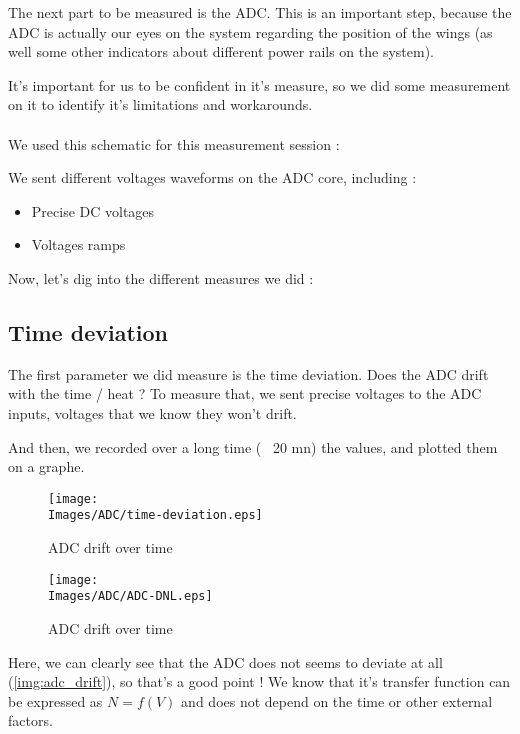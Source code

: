 The next part to be measured is the ADC. This is an important step, because the ADC is actually
our eyes on the system regarding the position of the wings (as well some other indicators about
different power rails on the system).

It's important for us to be confident in it's measure, so we did some measurement on it to identify
it's limitations and workarounds.

\paragraph{}
We used this schematic for this measurement session :


We sent different voltages waveforms on the ADC core, including :

\begin{itemize}[noitemsep]
    \item Precise DC voltages
    \item Voltages ramps
\end{itemize}

Now, let's dig into the different measures we did :

\FloatBarrier
\subsection{Time deviation}
The first parameter we did measure is the time deviation. Does the ADC drift with the time / heat ?
To measure that, we sent precise voltages to the ADC inputs, voltages that we know they won't drift.

And then, we recorded over a long time (~ 20 mn) the values, and plotted them on a graphe.

\begin{figure}[!hbt]
    \centering
    \begin{minipage}[c]{0.48\textwidth}
        \centering
        \texttt{[image: \\Images/ADC/time-deviation.eps]}
        \caption{ADC drift over time}\label{img:adc_drift}
    \end{minipage}%
    \hfill%
    \begin{minipage}[c]{0.48\textwidth}
        \centering
        \texttt{[image: \\Images/ADC/ADC-DNL.eps]}
        \caption{ADC drift over time}\label{img:adc_dnl}
    \end{minipage}%
\end{figure}
\FloatBarrier

Here, we can clearly see that the ADC does not seems to deviate at all (\ref{img:adc_drift}), so that's
a good point ! We know that it's transfer function can be expressed as $N = f(V)$ and does not depend
on the time or other external factors.

